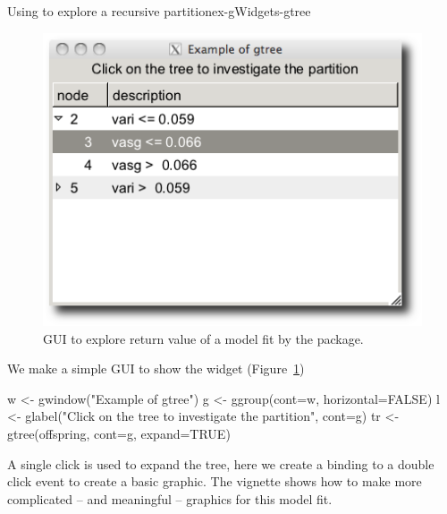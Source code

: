 \begin{example}{Using  to explore a recursive partition}{ex-gWidgets-gtree}
\begin{Schunk}
\end{Schunk}

\begin{figure}
  \centering
  \includegraphics[width=.5\textwidth]{ex-gWidgets-gtree}
  \caption{GUI to explore return value of a model fit by the   package.}
  \label{fig:ex-gWidgets-gtree-party}
\end{figure}


We make a simple GUI to show the widget (Figure~\ref{fig:ex-gWidgets-gtree-party})
\begin{Schunk}
\begin{Sinput}
 w <- gwindow("Example of gtree")
 g <- ggroup(cont=w, horizontal=FALSE)
 l <- glabel("Click on the tree to investigate the partition", 
             cont=g)
 tr <- gtree(offspring, cont=g, expand=TRUE)
\end{Sinput}
\end{Schunk}

A single click is used to expand the tree, here we create a binding to
a double click event to create a basic graphic. The 
vignette shows how to make more complicated -- and meaningful --
graphics for this model fit.
\begin{Schunk}
\end{Schunk}
\end{example}





